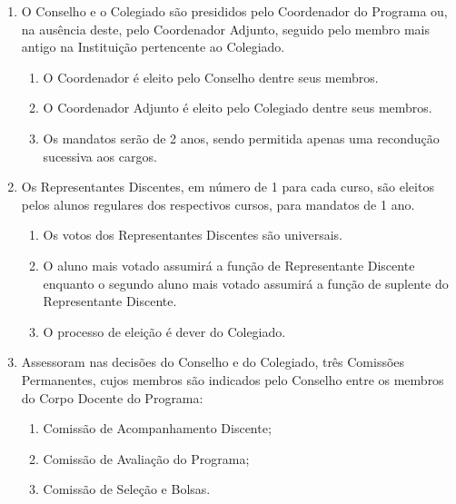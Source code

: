 \documentclass{article}
\newcommand{\grupoMenor}{Colegiado\xspace}
\newcommand{\grupoMaior}{Conselho\xspace}
\begin{document}
\begin{enumerate}
	\item O \grupoMaior e o \grupoMenor são presididos pelo Coordenador do Programa ou, na ausência deste, pelo Coordenador Adjunto, seguido pelo membro mais antigo na Instituição pertencente ao \grupoMenor.
	\begin{enumerate}
		\item O Coordenador é eleito pelo \grupoMaior dentre seus membros.
		\item O Coordenador Adjunto é eleito pelo \grupoMenor dentre seus membros.
		\item Os mandatos serão de 2 anos, sendo permitida apenas uma recondução sucessiva aos cargos.
	\end{enumerate}

	\item Os Representantes Discentes, em número de 1 para cada curso, são eleitos pelos alunos regulares dos respectivos cursos, para mandatos de 1 ano.
	\begin{enumerate}
		\item Os votos dos Representantes Discentes são universais.
		\item O aluno mais votado assumirá a função de Representante Discente enquanto o segundo aluno mais votado assumirá a função de suplente do Representante Discente.
		\item O processo de eleição é dever do \grupoMenor.
	\end{enumerate}	

	\item Assessoram nas decisões do \grupoMaior e do \grupoMenor, três Comissões Permanentes, cujos membros são indicados pelo \grupoMaior entre os membros do Corpo Docente do Programa:
	\begin{enumerate}[label=\Roman*]
		\item Comissão de Acompanhamento Discente;
		\item Comissão de Avaliação do Programa;
		\item Comissão de Seleção e Bolsas.
	\end{enumerate}

\end{enumerate}
\end{document}
